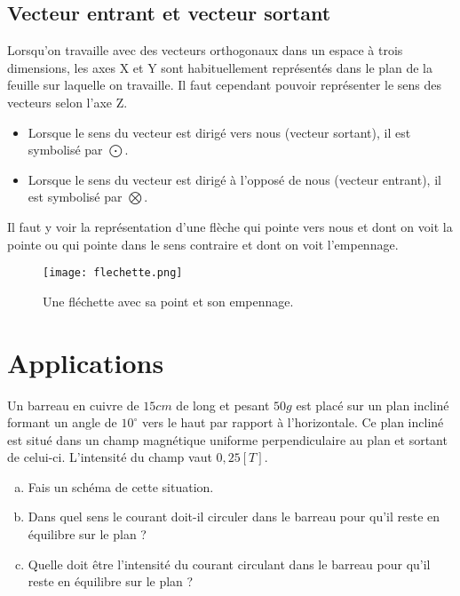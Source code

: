 \subsection{Vecteur entrant et vecteur sortant}
Lorsqu'on travaille avec des vecteurs orthogonaux dans un espace à trois dimensions, les axes X et Y sont habituellement représentés dans le plan de la feuille sur laquelle on travaille. Il faut cependant pouvoir représenter le sens des vecteurs selon l'axe Z.
\begin{itemize}[label=\textbullet]
    \item Lorsque le sens du vecteur est dirigé vers nous (vecteur sortant), il est symbolisé par \(\bigodot\).
    \item Lorsque le sens du vecteur est dirigé à l'opposé de nous (vecteur entrant), il est symbolisé par \(\bigotimes\).
\end{itemize}
Il faut y voir la représentation d'une flèche qui pointe vers nous et dont on voit la pointe ou qui pointe dans le sens contraire et dont on voit l'empennage.


\begin{figure}[ht]
    \centering
    \texttt{[image: flechette.png]}
    \caption{Une fléchette avec sa point et son empennage.}
    \label{flechette}
\end{figure}

\section{Applications}
\begin{exercise}
    Un barreau en cuivre de \(15cm\) de long et pesant \(50g\) est placé sur un plan incliné formant un angle de \(10^\circ\) vers le haut par rapport à l'horizontale. Ce plan incliné est situé dans un champ magnétique uniforme perpendiculaire au plan et sortant de celui-ci. L'intensité du champ vaut \(0,25[T]\).
    \begin{enumerate}[a)]
        \item Fais un schéma de cette situation.
        \item Dans quel sens le courant doit-il circuler dans le barreau pour qu'il reste en équilibre sur le plan ?
        \item Quelle doit être l'intensité du courant circulant dans le barreau pour qu'il reste en équilibre sur le plan ?
    \end{enumerate}
\end{exercise}

